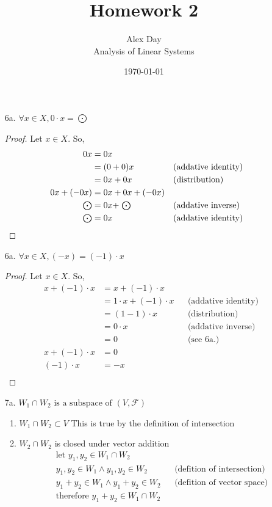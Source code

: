 \documentclass[12pt,fleqn,leqno,letterpaper]{article}
\title{Homework 2}
\author{Alex Day\\
	\small{Analysis of Linear Systems}
}
\date{\today}
\begin{document}
\maketitle

\begin{itemize}
	\item[6a.] $\forall x \in X, 0 \cdot x = \bigodot$

		\begin{proof}
			Let $x \in X$. So,
			\begin{align*}
				0x &= 0x\\
				   &= (0 + 0) x && \text{(addative identity)}\\
				   &= 0x + 0x && \text{(distribution)}\\
			0x + (-0x) &= 0x + 0x + (-0x)\\
  \mathrel{\mathsmaller{\bigodot}} &= 0x + \mathrel{\mathsmaller{\bigodot}}  && \text{(addative inverse)}\\
  \mathrel{\mathsmaller{\bigodot}} &= 0x  && \text{(addative identity)}
			\end{align*}
		\end{proof}

	\item[6a.] $\forall x \in X, (-x) = (-1) \cdot x$

		\begin{proof}
			Let $x \in X$. So,
			\begin{align*}
				x + (-1) \cdot x &= x + (-1) \cdot x \\
				                &= 1 \cdot x + (-1) \cdot x && \text{(addative identity)} \\
						&= (1 - 1) \cdot x && \text{(distribution)} \\
						&= 0 \cdot x && \text{(addative inverse)} \\
						&= 0 && \text{(see 6a.)}\\
				x + (-1) \cdot x &= 0 &&\\
				    (-1) \cdot x &= -x &&\\
			\end{align*}
		\end{proof}

	\item[7a.] $W_{1} \cap W_{2}\text{ is a subspace of }(V, \mathscr{F})$
		\begin{enumerate}
			\item $W_{1} \cap W_{2} \subset V$
				This is true by the definition of intersection
			\item $W_{2} \cap W_{2}$ is closed under vector addition
				\begin{align*}
					& \text{let } y_{1}, y_{2} \in W_{1} \cap W_{2} && \\
					& y_{1}, y_{2} \in W_{1} \wedge y_{1}, y_{2} \in W_{2} && \text{(defition of intersection)}\\
					& y_{1} + y_{2} \in W_{1} \wedge y_{1} + y_{2} \in W_{2} && \text{(defition of vector space)}\\
					& \text{therefore } y_{1} + y_{2} \in W_{1} \cap W_{2} &&\\
				\end{align*}


\end{enumerate}
\end{itemize}
\end{document}

